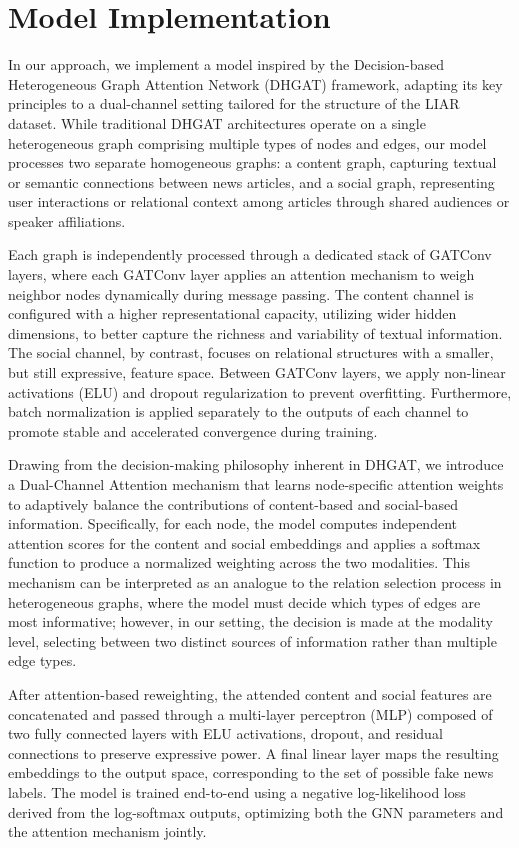 \section{Model Implementation}

In our approach, we implement a model inspired by the Decision-based Heterogeneous Graph Attention Network (DHGAT) framework, adapting its key principles to a dual-channel setting tailored for the structure of the LIAR dataset. While traditional DHGAT architectures operate on a single heterogeneous graph comprising multiple types of nodes and edges, our model processes two separate homogeneous graphs: a content graph, capturing textual or semantic connections between news articles, and a social graph, representing user interactions or relational context among articles through shared audiences or speaker affiliations.

Each graph is independently processed through a dedicated stack of GATConv layers, where each GATConv layer applies an attention mechanism to weigh neighbor nodes dynamically during message passing. The content channel is configured with a higher representational capacity, utilizing wider hidden dimensions, to better capture the richness and variability of textual information. The social channel, by contrast, focuses on relational structures with a smaller, but still expressive, feature space. Between GATConv layers, we apply non-linear activations (ELU) and dropout regularization to prevent overfitting. Furthermore, batch normalization is applied separately to the outputs of each channel to promote stable and accelerated convergence during training.

Drawing from the decision-making philosophy inherent in DHGAT, we introduce a Dual-Channel Attention mechanism that learns node-specific attention weights to adaptively balance the contributions of content-based and social-based information. Specifically, for each node, the model computes independent attention scores for the content and social embeddings and applies a softmax function to produce a normalized weighting across the two modalities. This mechanism can be interpreted as an analogue to the relation selection process in heterogeneous graphs, where the model must decide which types of edges are most informative; however, in our setting, the decision is made at the modality level, selecting between two distinct sources of information rather than multiple edge types.

After attention-based reweighting, the attended content and social features are concatenated and passed through a multi-layer perceptron (MLP) composed of two fully connected layers with ELU activations, dropout, and residual connections to preserve expressive power. A final linear layer maps the resulting embeddings to the output space, corresponding to the set of possible fake news labels. The model is trained end-to-end using a negative log-likelihood loss derived from the log-softmax outputs, optimizing both the GNN parameters and the attention mechanism jointly.

